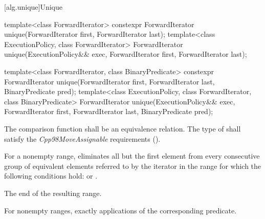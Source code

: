 [alg.unique]{Unique}

%
\begin{itemdecl}
template<class ForwardIterator>
  constexpr ForwardIterator unique(ForwardIterator first, ForwardIterator last);
template<class ExecutionPolicy, class ForwardIterator>
  ForwardIterator unique(ExecutionPolicy&& exec,
                         ForwardIterator first, ForwardIterator last);

template<class ForwardIterator, class BinaryPredicate>
  constexpr ForwardIterator unique(ForwardIterator first, ForwardIterator last,
                                   BinaryPredicate pred);
template<class ExecutionPolicy, class ForwardIterator, class BinaryPredicate>
  ForwardIterator unique(ExecutionPolicy&& exec,
                         ForwardIterator first, ForwardIterator last,
                         BinaryPredicate pred);
\end{itemdecl}

\begin{itemdescr}
\pnum
\requires
The comparison function shall be an equivalence relation.
The type of  shall satisfy the
\textit{Cpp98MoveAssignable} requirements ().

\pnum
\effects
For a nonempty range, eliminates all but the first element from every
consecutive group of equivalent elements referred to by the iterator
in the range
for which the following conditions hold:
or
.

\pnum
\returns
The end of the resulting range.

\pnum
\complexity
For nonempty ranges, exactly
applications of the corresponding predicate.
\end{itemdescr}

